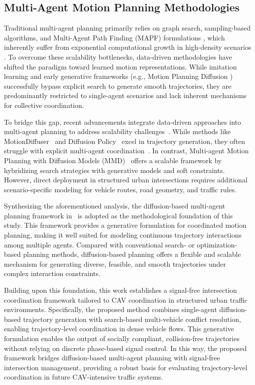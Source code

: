 \documentclass[journal]{IEEEtran}
\begin{document}
\subsection{Multi-Agent Motion Planning Methodologies}
Traditional multi-agent planning primarily relies on graph search, sampling-based algorithms, and Multi-Agent Path Finding (MAPF) formulations
\cite{hart1968,koenig2002,kavraki1996,lavalle1998,karaman2011,stern2019}, which inherently suffer from exponential computational growth in high-density scenarios \cite{sharon2015}. To overcome these scalability bottlenecks, data-driven methodologies have shifted the paradigm toward learned motion representations. While imitation learning \cite{pomerleau1988,abbeel2004,ho2016} and early generative frameworks (e.g., Motion Planning Diffusion \cite{carvalho2023}) successfully bypass explicit search to generate smooth trajectories, they are predominantly restricted to single-agent scenarios and lack inherent mechanisms for collective coordination.

To bridge this gap, recent advancements integrate data-driven approaches into multi-agent planning to address scalability challenges~\cite{stern2019}. While methods like MotionDiffuser~\cite{jiang2023} and Diffusion Policy~\cite{chi2025} excel in trajectory generation, they often struggle with explicit multi-agent coordination~\cite{sartoretti2019}. In contrast, Multi-agent Motion Planning with Diffusion Models (MMD)~\cite{shaoul2025} offers a scalable framework by hybridizing search strategies with generative models and soft constraints. However, direct deployment in structured urban intersections requires additional scenario-specific modeling for vehicle routes, road geometry, and traffic rules.

Synthesizing the aforementioned analysis, the diffusion-based multi-agent planning framework in~\cite{shaoul2025} is adopted as the methodological foundation of this study. This framework provides a generative formulation for coordinated motion planning, making it well suited for modeling continuous trajectory interactions among multiple agents. Compared with conventional search- or optimization-based planning methods, diffusion-based planning offers a flexible and scalable mechanism for generating diverse, feasible, and smooth trajectories under complex interaction constraints.

Building upon this foundation, this work establishes a signal-free intersection coordination framework tailored to CAV coordination in structured urban traffic environments. Specifically, the proposed method combines single-agent diffusion-based trajectory generation with search-based multi-vehicle conflict resolution, enabling trajectory-level coordination in dense vehicle flows. This generative formulation enables the output of socially compliant, collision-free trajectories without relying on discrete phase-based signal control. In this way, the proposed framework bridges diffusion-based multi-agent planning with signal-free intersection management, providing a robust basis for evaluating trajectory-level coordination in future CAV-intensive traffic systems.
\end{document}

